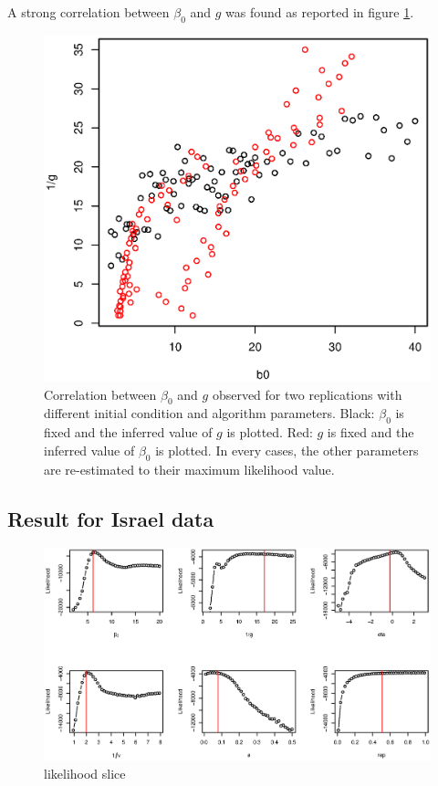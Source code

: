 \documentclass[12pt]{article}
\begin{document}
A strong correlation between $\beta_0$ and $g$ was found as reported in figure
\ref{fig:cor}.


\begin{figure}[htb]
  \center
    \includegraphics[width= 0.5 \linewidth]{graph_annexe/corr_g_b0.eps}
    \caption{Correlation between $\beta_0$ and $g$ observed for two
      replications with different initial condition and algorithm
      parameters. Black: $\beta_0$ is fixed and the inferred value of
      $g$ is plotted. Red: $g$ is fixed and the inferred value of
      $\beta_0$ is plotted. In every cases, the other parameters are
      re-estimated to their maximum likelihood value. }
  \label{fig:cor}
\end{figure}

\clearpage

\subsection{Result for Israel data}


\begin{figure}[htb]
  \center
    \includegraphics[width= 0.5 \linewidth]{graph_annexe/slice_israel.eps}
    \caption{likelihood slice}
  \label{fig:israel}
\end{figure}




\clearpage
\end{document}

